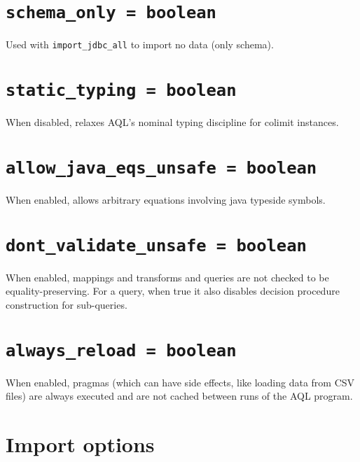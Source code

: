 \documentclass[10pt]{book}
\begin{document}
\section{{\tt schema\_only = boolean}}

Used with {\tt import\_jdbc\_all} to import no data (only schema).

\section{{\tt static\_typing = boolean}}
When disabled, relaxes AQL's nominal typing discipline for colimit instances.

\section{{\tt allow\_java\_eqs\_unsafe = boolean}}
When enabled, allows arbitrary equations involving java typeside symbols.

\section{{\tt dont\_validate\_unsafe = boolean}}
When enabled, mappings and transforms and queries are not checked to be equality-preserving.  For a query, when true it also disables decision procedure construction for sub-queries.

\section{{\tt always\_reload = boolean}}
When enabled, pragmas (which can have side effects, like loading data from CSV files) are always executed and are not cached between runs of the AQL program.

\section{Import options}
%
\end{document}
